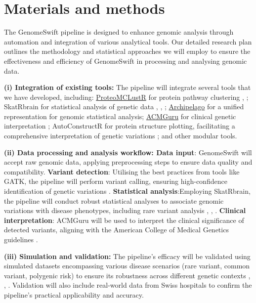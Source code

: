
\section{Materials and methods}\label{detailed-research-plan}

The GenomeSwift pipeline is designed to enhance genomic analysis through
automation and integration of various analytical tools. Our detailed
research plan outlines the methodology and statistical approaches we
will employ to ensure the effectiveness and efficiency of GenomeSwift in
processing and analysing genomic data.

\textbf{(i) Integration of existing tools:} The pipeline will integrate
several tools that we have developed, including:
\href{https://github.com/DylanLawless/ProteoMCLustR}{ProteoMCLustR} for
protein pathway clustering \citep{ref7}, \citep{ref8}; SkatRbrain for statistical
analysis of genetic data \citep{ref9}, \citep{ref10}, \citep{ref11};
\href{https://github.com/DylanLawless/archipelago}{Archipelago} for a
unified representation for genomic statistical analysis;
\href{https://github.com/DylanLawless/ACMGuru}{ACMGuru} for clinical
genetic interpretation \citep{ref12}; AutoConstructR for protein structure
plotting, facilitating a comprehensive interpretation of genetic
variations \citep{ref16}; and other modular tools.

\textbf{(ii) Data processing and analysis workflow: Data input}:
GenomeSwift will accept raw genomic data, applying preprocessing steps
to ensure data quality and compatibility. \textbf{Variant detection}:
Utilising the best practices from tools like GATK, the pipeline will
perform variant calling, ensuring high-confidence identification of
genetic variations \citep{ref4}. \textbf{Statistical analysis}:Employing
SkatRbrain, the pipeline will conduct robust statistical analyses to
associate genomic variations with disease phenotypes, including rare
variant analysis \citep{ref9}, \citep{ref10}, \citep{ref11}. \textbf{Clinical
interpretation}: ACMGuru will be used to interpret the clinical
significance of detected variants, aligning with the American College of
Medical Genetics guidelines \citep{ref12}.

\textbf{(iii) Simulation and validation:} The pipeline's
efficacy will be validated using simulated datasets encompassing various
disease scenarios (rare variant, common variant, polygenic risk) to
ensure its robustness across different genetic contexts \citep{ref3},
\citep{ref17}, \citep{ref18}. Validation will also include real-world data from
Swiss hospitals to confirm the pipeline's practical
applicability and accuracy.

